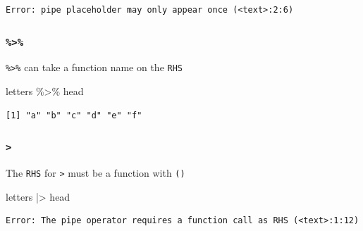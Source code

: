 \documentclass[
  letterpaper,
  DIV=11,
  numbers=noendperiod]{scrreprt}
\newenvironment{Shaded}{\begin{snugshade}}{\end{snugshade}}
\newcommand{\NormalTok}[1]{\textcolor[rgb]{0.00,0.23,0.31}{#1}}
\newcommand{\SpecialCharTok}[1]{\textcolor[rgb]{0.37,0.37,0.37}{#1}}
\begin{document}
\begin{tcolorbox}
\begin{tcolorbox}
\begin{verbatim}
Error: pipe placeholder may only appear once (<text>:2:6)
\end{verbatim}

\end{tcolorbox}

\begin{tcolorbox}[enhanced jigsaw, bottomtitle=1mm, bottomrule=.15mm, toprule=.15mm, opacityback=0, leftrule=.75mm, breakable, colback=white, toptitle=1mm, left=2mm, coltitle=black, titlerule=0mm, opacitybacktitle=0.6, title=\textcolor{quarto-callout-note-color}{\faInfo}\hspace{0.5em}{Right Hand Side (RHS)}, rightrule=.15mm, arc=.35mm, colframe=quarto-callout-note-color-frame, colbacktitle=quarto-callout-note-color!10!white]

\subsubsection{\texorpdfstring{\texttt{\%\textgreater{}\%}}{\%\textgreater\%}}

\texttt{\%\textgreater{}\%} can take a function name on the \texttt{RHS}

\begin{Shaded}
\begin{Highlighting}[]
\NormalTok{letters }\SpecialCharTok{\%\textgreater{}\%}\NormalTok{ head}
\end{Highlighting}
\end{Shaded}

\begin{verbatim}
[1] "a" "b" "c" "d" "e" "f"
\end{verbatim}

\subsubsection{\texorpdfstring{\texttt{\textbar{}\textgreater{}}}{\textbar\textgreater{}}}

The \texttt{RHS} for \texttt{\textbar{}\textgreater{}} must be a
function with \texttt{()}

\begin{Shaded}
\begin{Highlighting}[]
\NormalTok{letters }\SpecialCharTok{|\textgreater{}}\NormalTok{ head}
\end{Highlighting}
\end{Shaded}

\begin{verbatim}
Error: The pipe operator requires a function call as RHS (<text>:1:12)
\end{verbatim}


\end{tcolorbox}
\end{tcolorbox}
\end{document}
